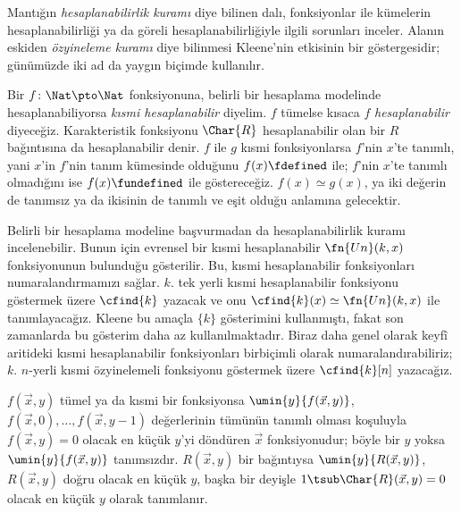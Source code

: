 


Mantığın \emph{hesaplanabilirlik kuramı} diye bilinen dalı, fonksiyonlar ile
kümelerin hesaplanabilirliği ya da göreli hesaplanabilirliğiyle ilgili
sorunları inceler. Alanın eskiden \emph{özyineleme kuramı} diye bilinmesi
Kleene'nin etkisinin bir göstergesidir; günümüzde iki ad da yaygın biçimde
kullanılır.

Bir $f\colon\Nat\pto\Nat$ fonksiyonuna, belirli bir hesaplama modelinde
hesaplanabiliyorsa \emph{kısmi hesaplanabilir} diyelim. $f$ tümelse kısaca
$f$ \emph{hesaplanabilir} diyeceğiz. Karakteristik fonksiyonu $\Char{R}$
hesaplanabilir olan bir $R$ bağıntısına da hesaplanabilir denir. $f$ ile $g$
kısmi fonksiyonlarsa $f$'nin $x$'te tanımlı, yani $x$'in $f$'nin tanım
kümesinde olduğunu $f(x)\fdefined$ ile; $f$'nin $x$'te tanımlı olmadığını ise
$f(x)\fundefined$ ile göstereceğiz. $f(x)\simeq g(x)$, ya iki değerin de
tanımsız ya da ikisinin de tanımlı ve eşit olduğu anlamına gelecektir.

Belirli bir hesaplama modeline başvurmadan da hesaplanabilirlik kuramı
incelenebilir. Bunun için evrensel bir kısmi hesaplanabilir
$\fn{Un}(k,x)$ fonksiyonunun bulunduğu gösterilir. Bu, kısmi hesaplanabilir
fonksiyonları numaralandırmamızı sağlar. $k$. tek yerli kısmi hesaplanabilir
fonksiyonu göstermek üzere $\cfind{k}$ yazacak ve onu
$\cfind{k}(x)\simeq\fn{Un}(k,x)$ ile tanımlayacağız. Kleene bu amaçla
$\{k\}$ gösterimini kullanmıştı, fakat son zamanlarda bu gösterim daha az
kullanılmaktadır. Biraz daha genel olarak keyfî aritideki kısmi hesaplanabilir
fonksiyonları birbiçimli olarak numaralandırabiliriz; $k$. $n$-yerli kısmi
özyinelemeli fonksiyonu göstermek üzere $\cfind{k}[n]$ yazacağız.

$f(\vec x,y)$ tümel ya da kısmi bir fonksiyonsa
$\umin{y}{f(\vec x,y)}$, $f(\vec x,0),\dots,f(\vec x,y-1)$ değerlerinin
tümünün tanımlı olması koşuluyla $f(\vec x,y)=0$ olacak en küçük $y$'yi
döndüren $\vec x$ fonksiyonudur; böyle bir $y$ yoksa
$\umin{y}{f(\vec x,y)}$ tanımsızdır. $R(\vec x,y)$ bir bağıntıysa
$\umin{y}{R(\vec x,y)}$, $R(\vec x,y)$ doğru olacak en küçük $y$, başka bir
deyişle $1\tsub\Char{R}(\vec x,y)=0$ olacak en küçük $y$ olarak tanımlanır.

